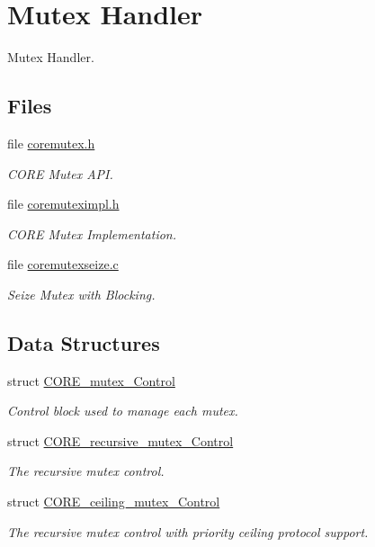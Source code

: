 \hypertarget{group__RTEMSScoreMutex}{}\section{Mutex Handler}
\label{group__RTEMSScoreMutex}


Mutex Handler.  


\subsection*{Files}
\begin{DoxyCompactItemize}
\item 
file \mbox{\hyperlink{coremutex_8h}{coremutex.\+h}}
\begin{DoxyCompactList}\small\item\em C\+O\+RE Mutex A\+PI. \end{DoxyCompactList}\item 
file \mbox{\hyperlink{coremuteximpl_8h}{coremuteximpl.\+h}}
\begin{DoxyCompactList}\small\item\em C\+O\+RE Mutex Implementation. \end{DoxyCompactList}\item 
file \mbox{\hyperlink{coremutexseize_8c}{coremutexseize.\+c}}
\begin{DoxyCompactList}\small\item\em Seize Mutex with Blocking. \end{DoxyCompactList}\end{DoxyCompactItemize}
\subsection*{Data Structures}
\begin{DoxyCompactItemize}
\item 
struct \mbox{\hyperlink{structCORE__mutex__Control}{C\+O\+R\+E\+\_\+mutex\+\_\+\+Control}}
\begin{DoxyCompactList}\small\item\em Control block used to manage each mutex. \end{DoxyCompactList}\item 
struct \mbox{\hyperlink{structCORE__recursive__mutex__Control}{C\+O\+R\+E\+\_\+recursive\+\_\+mutex\+\_\+\+Control}}
\begin{DoxyCompactList}\small\item\em The recursive mutex control. \end{DoxyCompactList}\item 
struct \mbox{\hyperlink{structCORE__ceiling__mutex__Control}{C\+O\+R\+E\+\_\+ceiling\+\_\+mutex\+\_\+\+Control}}
\begin{DoxyCompactList}\small\item\em The recursive mutex control with priority ceiling protocol support. \end{DoxyCompactList}\end{DoxyCompactItemize}
